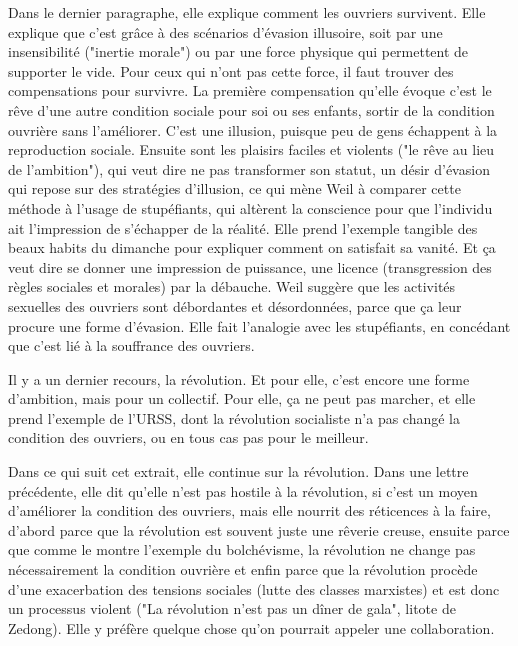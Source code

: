 \documentclass[a4paper,12pt]{book}
\begin{document}
\par Dans le dernier paragraphe, elle explique comment les ouvriers survivent. Elle explique que c'est grâce à des scénarios d'évasion illusoire, soit par une insensibilité ("inertie morale") ou par une force physique qui permettent de supporter le vide. Pour ceux qui n'ont pas cette force, il faut trouver des compensations pour survivre. La première compensation qu'elle évoque c'est le rêve d'une autre condition sociale pour soi ou ses enfants, sortir de la condition ouvrière sans l'améliorer. C'est une illusion, puisque peu de gens échappent à la reproduction sociale. Ensuite sont les plaisirs faciles et violents ("le rêve au lieu de l'ambition"), qui veut dire ne pas transformer son statut, un désir d'évasion qui repose sur des stratégies d'illusion, ce qui mène Weil à comparer cette méthode à l'usage de stupéfiants, qui altèrent la conscience pour que l'individu ait l'impression de s'échapper de la réalité. Elle prend l'exemple tangible des beaux habits du dimanche pour expliquer comment on satisfait sa vanité. Et ça veut dire se donner une impression de puissance, une licence (transgression des règles sociales et morales) par la débauche. Weil suggère que les activités sexuelles des ouvriers sont débordantes et désordonnées, parce que ça leur procure une forme d'évasion. Elle fait l'analogie avec les stupéfiants, en concédant que c'est lié à la souffrance des ouvriers.
\par Il y a un dernier recours, la révolution. Et pour elle, c'est encore une forme d'ambition, mais pour un collectif. Pour elle, ça ne peut pas marcher, et elle prend l'exemple de l'URSS, dont la révolution socialiste n'a pas changé la condition des ouvriers, ou en tous cas pas pour le meilleur.
\par Dans ce qui suit cet extrait, elle continue sur la révolution. Dans une lettre précédente, elle dit qu'elle n'est pas hostile à la révolution, si c'est un moyen d'améliorer la condition des ouvriers, mais elle nourrit des réticences à la faire, d'abord parce que la révolution est souvent juste une rêverie creuse, ensuite parce que comme le montre l'exemple du bolchévisme, la révolution ne change pas nécessairement la condition ouvrière et enfin parce que la révolution procède d'une exacerbation des tensions sociales (lutte des classes marxistes) et est donc un processus violent ("La révolution n'est pas un dîner de gala", litote de Zedong). Elle y préfère quelque chose qu'on pourrait appeler une collaboration.
\end{document}
